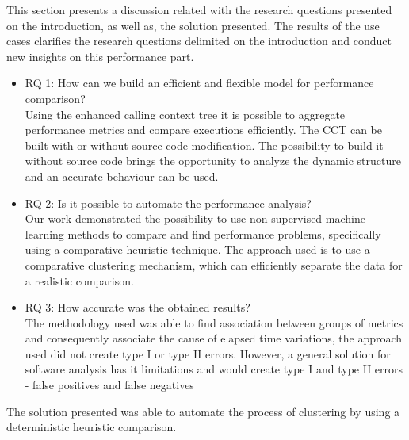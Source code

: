 
This section presents a discussion related with the research questions presented on the introduction, as well as, the solution presented. The results of the use cases clarifies the research questions delimited on the introduction and conduct new insights on this performance part.

\begin{itemize}

\item RQ 1: How can we build an efficient and flexible model for performance comparison?\\
    Using the enhanced calling context tree it is possible to aggregate performance metrics and compare executions efficiently. The CCT can be built with or without source code modification. The possibility to build it without source code brings the opportunity to analyze the dynamic structure and an accurate behaviour can be used.\\
    
\item RQ 2: Is it possible to automate the performance analysis?\\
    Our work demonstrated the possibility to use non-supervised machine learning methods to compare and find performance problems, specifically using a comparative heuristic technique. The approach used is to use a comparative clustering mechanism, which can efficiently separate the data for a realistic comparison.\\
    
\item RQ 3: How accurate was the obtained results?\\
    The methodology used was able to find association between groups of metrics and consequently associate the cause of elapsed time variations, the approach used did not create type I or type II errors. However, a general solution for software analysis has it limitations and would create type I and type II errors - false positives and false negatives
    
\end{itemize}

The solution presented was able to automate the process of clustering by using a deterministic heuristic comparison.
